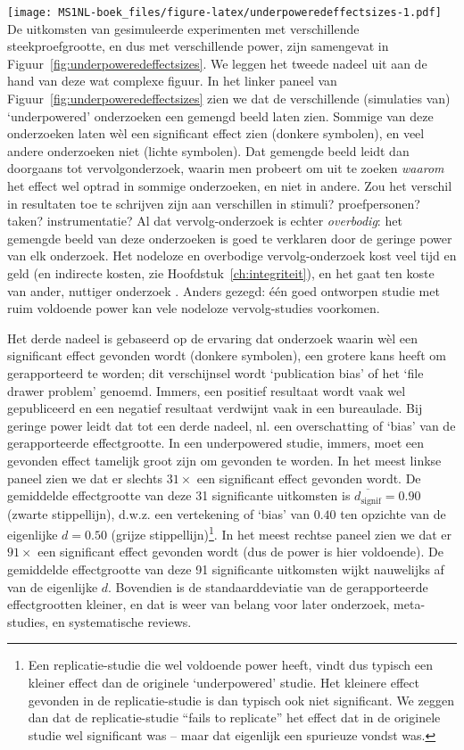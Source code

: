 \documentclass[
]{book}
\begin{document}
\texttt{[image: MS1NL-boek\_files/figure-latex/underpoweredeffectsizes-1.pdf]}
De uitkomsten van gesimuleerde experimenten met verschillende
steekproefgrootte, en dus met verschillende power, zijn samengevat in
Figuur~\ref{fig:underpoweredeffectsizes}. We leggen het tweede nadeel uit aan de hand van deze wat complexe figuur. In het linker paneel van
Figuur~\ref{fig:underpoweredeffectsizes} zien we dat de verschillende
(simulaties van) `underpowered' onderzoeken een gemengd beeld laten
zien. Sommige van deze onderzoeken laten wèl een significant effect zien
(donkere symbolen), en veel andere onderzoeken niet (lichte symbolen).
Dat gemengde beeld leidt dan doorgaans tot vervolgonderzoek, waarin men
probeert om uit te zoeken \emph{waarom} het effect wel optrad in sommige
onderzoeken, en niet in andere. Zou het verschil in resultaten toe te
schrijven zijn aan verschillen in stimuli? proefpersonen? taken?
instrumentatie? Al dat vervolg-onderzoek is echter \emph{overbodig}: het
gemengde beeld van deze onderzoeken is goed te verklaren door de geringe
power van elk onderzoek. Het nodeloze en overbodige vervolg-onderzoek
kost veel tijd en geld (en indirecte kosten, zie
Hoofdstuk~\ref{ch:integriteit}), en het gaat ten koste van ander, nuttiger
onderzoek \citep[p.118]{Schm96}. Anders gezegd: één goed ontworpen studie met
ruim voldoende power kan vele nodeloze vervolg-studies voorkomen.

Het derde nadeel is gebaseerd op de ervaring dat onderzoek waarin wèl
een significant effect gevonden wordt (donkere symbolen), een grotere
kans heeft om gerapporteerd te worden; dit verschijnsel wordt
`publication bias' of het `file drawer problem' genoemd. Immers, een
positief resultaat wordt vaak wel gepubliceerd en een negatief resultaat
verdwijnt vaak in een bureaulade. Bij geringe power leidt dat tot een
derde nadeel, nl. een overschatting of `bias' van de gerapporteerde
effectgrootte. In een underpowered studie, immers, moet een gevonden
effect tamelijk groot zijn om gevonden te worden. In het meest linkse
paneel zien we dat er slechts \(31\times\) een significant effect gevonden
wordt. De gemiddelde effectgrootte van deze 31 significante uitkomsten
is \(\overline{d_{\textrm{signif}}}=0.90\) (zwarte stippellijn), d.w.z.
een vertekening of `bias' van \(0.40\) ten opzichte van de eigenlijke
\(d=0.50\) (grijze stippellijn)\footnote{Een replicatie-studie die wel voldoende power heeft, vindt dus typisch een kleiner effect dan de originele `underpowered' studie. Het kleinere effect gevonden in de replicatie-studie is dan typisch ook niet significant. We zeggen dan dat de replicatie-studie ``fails to replicate'' het effect dat in de originele studie wel significant was -- maar dat eigenlijk een spurieuze vondst was.}. In het meest rechtse paneel zien we dat
er \(91\times\) een significant effect gevonden wordt (dus de power is
hier voldoende). De gemiddelde effectgrootte van deze 91 significante
uitkomsten wijkt nauwelijks af van de eigenlijke \(d\). Bovendien is de
standaarddeviatie van de gerapporteerde effectgrootten kleiner, en dat
is weer van belang voor later onderzoek, meta-studies, en systematische
reviews.
\end{document}
